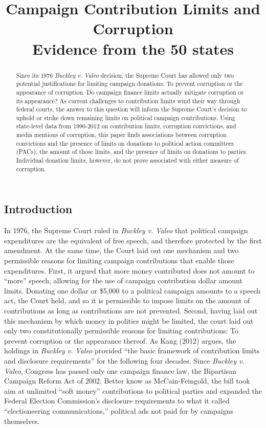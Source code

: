 \documentclass{jopsubmission}
\date{\vspace{-5ex}}
\title{Campaign Contribution Limits and Corruption\\
Evidence from the 50 states}
\begin{document}
    \maketitle
            \begin{abstract}
        Since its 1976 \emph{Buckley v. Valeo} decision, the Supreme Court has
        allowed only two potential justifications for limiting campaign
        donations: To prevent corruption or the appearance of corruption. Do
        campaign finance limits actually mitigate corruption or its appearance?
        As current challenges to contribution limits wind their way through
        federal courts, the answer to this question will inform the Supreme
        Court's decision to uphold or strike down remaining limits on political
        campaign contributions. Using state-level data from 1990-2012 on
        contribution limits, corruption convictions, and media mentions of
        corruption, this paper finds associations between corruption convictions
        and the presence of limits on donations to political action committees
        (PACs), the amount of those limits, and the presence of limits on
        donations to parties. Individual donation limits, however, do not prove
        associated with either measure of corruption.
        \end{abstract}
    

\newpage 

\subsection{Introduction}\label{introduction}

In 1976, the Supreme Court ruled in \emph{Buckley v. Valeo} that
political campaign expenditures are the equivalent of free speech, and
therefore protected by the first amendment. At the same time, the Court
laid out one mechanism and two permissible reasons for limiting campaign
contributions that enable those expenditures. First, it argued that more
money contributed does not amount to ``more'' speech, allowing for the
use of campaign contribution dollar amount limits. Donating one dollar
or \$5,000 to a political campaign amounts to a speech act, the Court
held, and so it is permissible to impose limits on the amount of
contributions as long as contributions are not prevented. Second, having
laid out this mechanism by which money in politics might be limited, the
court laid out only two constitutionally permissible reasons for
limiting contributions: To prevent corruption or the appearance thereof.
As Kang (2012) argues, the holdings in \emph{Buckley v. Valeo} provided
``the basic framework of contribution limits and disclosure
requirements'' for the following four decades. Since \emph{Buckley v.
Valeo}, Congress has passed only one campaign finance law, the
Bipartisan Campaign Reform Act of 2002. Better know as McCain-Feingold,
the bill took aim at unlimited ``soft money'' contributions to political
parties and expanded the Federal Election Commission's disclosure
requirements to what it called ``electioneering communications,''
political ads not paid for by campaigns themselves.
\end{document}
